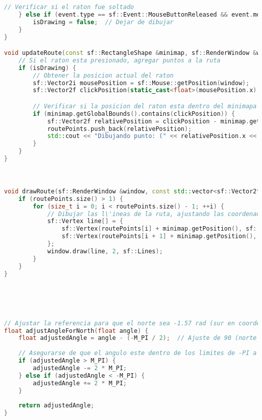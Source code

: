 \begin{lstlisting}[language={C++}, caption={Primer ajuste de c\'odigo}, label={Script}]
    // Verificar si el raton fue soltado
    } else if (event.type == sf::Event::MouseButtonReleased && event.mouseButton.button == sf::Mouse::Left) {
        isDrawing = false;  // Dejar de dibujar
    }
}

void updateRoute(const sf::RectangleShape &minimap, sf::RenderWindow &window) {
    // Si el raton esta presionado, agregar puntos a la ruta
    if (isDrawing) {
        // Obtener la posicion actual del raton
        sf::Vector2i mousePosition = sf::Mouse::getPosition(window);
        sf::Vector2f clickPosition(static_cast<float>(mousePosition.x), static_cast<float>(mousePosition.y));

        // Verificar si la posicion del raton esta dentro del minimapa
        if (minimap.getGlobalBounds().contains(clickPosition)) {
            sf::Vector2f relativePosition = clickPosition - minimap.getPosition();
            routePoints.push_back(relativePosition);
            std::cout << "Dibujando punto: (" << relativePosition.x << ", " << relativePosition.y << ")" << std::endl;
        }
    }
}



void drawRoute(sf::RenderWindow &window, const std::vector<sf::Vector2f> &routePoints, const sf::RectangleShape &minimap) {
    if (routePoints.size() > 1) {
        for (size_t i = 0; i < routePoints.size() - 1; ++i) {
            // Dibujar las l\'ineas de la ruta, ajustando las coordenadas en funci\'on de la posici\'on del robot
            sf::Vertex line[] = {
                sf::Vertex(routePoints[i] + minimap.getPosition(), sf::Color::Red), // Ajuste de posici\'on para el minimapa
                sf::Vertex(routePoints[i + 1] + minimap.getPosition(), sf::Color::Red)
            };
            window.draw(line, 2, sf::Lines);
        }
    }
}





// Ajustar la referencia para que el norte sea -1.57 rad (sur en coordenadas cartesianas es 0 rad)
float adjustAngleForNorth(float angle) {
    float adjustedAngle = angle - (-M_PI / 2);  // Ajuste de 90 (norte en -90)
    
    // Asegurarse de que el angulo este dentro de los limites de -PI a PI
    if (adjustedAngle > M_PI) {
        adjustedAngle -= 2 * M_PI;
    } else if (adjustedAngle < -M_PI) {
        adjustedAngle += 2 * M_PI;
    }
    
    return adjustedAngle;
}








\end{lstlisting}
